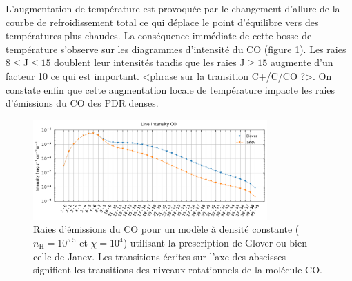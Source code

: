 L'augmentation de température est provoquée par le changement d'allure de la courbe de refroidissement total ce qui déplace le point d'équilibre vers des températures plus chaudes. La conséquence immédiate de cette bosse de température s'observe sur les diagrammes d'intensité du $\mathrm{CO}$ (figure \ref{fig:H2:bosse:ICO}). Les raies $ 8 \leq \mathrm{J}\leq 15$ doublent leur intensités tandis que les raies $\mathrm{J}\geq 15$ augmente d'un facteur 10 ce qui est important. <phrase sur la transition C+/C/CO ?>. On constate enfin que cette augmentation locale de température impacte les raies d'émissions du $\mathrm{CO}$ des PDR denses. 

\begin{figure}[!h]
    \centering
    \includegraphics[trim = {0 0 0 1cm },clip,width=0.8\textwidth]{figure/H2/bosse_dcte_janevVSglover/I_comp_CO.pdf}
    \caption{Raies d'émissions du $\mathrm{CO}$ pour un modèle à densité constante ($n_\mathrm{H} = 10^{5.5}$ et $\chi = 10^4$) utilisant la prescription de Glover ou bien celle de Janev. Les transitions écrites sur l'axe des abscisses signifient les transitions des niveaux rotationnels de la molécule $\mathrm{CO}$.}
    \label{fig:H2:bosse:ICO}
\end{figure}



